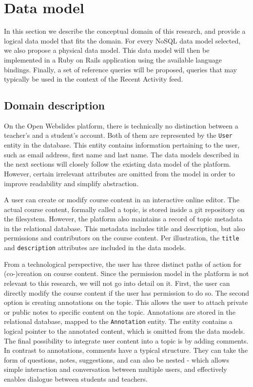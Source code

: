 \chapter{Data model}
\label{ch:data-model}

In this section we describe the conceptual domain of this research, and provide a logical data model that fits the domain.
For every NoSQL data model selected, we also propose a physical data model.
This data model will then be implemented in a Ruby on Rails application using the available language bindings.
Finally, a set of reference queries will be proposed, queries that may typically be used in the context of the Recent Activity feed.

\section{Domain description}
\label{sec:domain-description}

On the Open Webslides platform, there is technically no distinction between a teacher's and a student's account.
Both of them are represented by the \texttt{User} entity in the database.
This entity contains information pertaining to the user, such as email address, first name and last name.
The data models described in the next sections will closely follow the existing data model of the platform.
However, certain irrelevant attributes are omitted from the model in order to improve readability and simplify abstraction.

A user can create or modify course content in an interactive online editor.
The actual course content, formally called a topic, is stored inside a git repository on the filesystem.
However, the platform also maintains a record of topic metadata in the relational database.
This metadata includes title and description, but also permissions and contributors on the course content.
Per illustration, the \texttt{title} and \texttt{description} attributes are included in the data models.

From a technological perspective, the user has three distinct paths of action for (co-)creation on course content.
Since the permission model in the platform is not relevant to this research, we will not go into detail on it.
First, the user can directly modify the course content if the user has permission to do so.
The second option is creating annotations on the topic.
This allows the user to attach private or public notes to specific content on the topic.
Annotations are stored in the relational database, mapped to the \texttt{Annotation} entity.
The entity contains a logical pointer to the annotated content, which is omitted from the data models.
The final possibility to integrate user content into a topic is by adding comments.
In contrast to annotations, comments have a typical structure.
They can take the form of questions, notes, suggestions, and can also be nested - which allows simple interaction and conversation between multiple users, and effectively enables dialogue between students and teachers.

